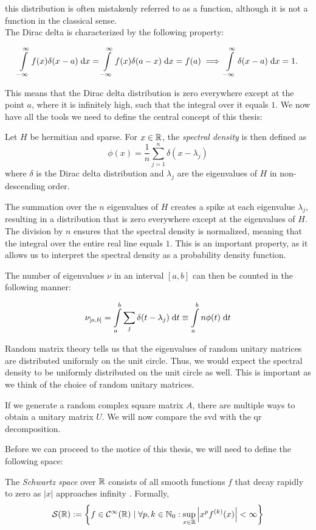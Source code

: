 this distribution is often mistakenly referred to as a function,
although it is not a function in the classical sense.\\
The Dirac delta is characterized by the following property:

\[
\int\limits_{-\infty}^{\infty} f(x) \delta(x-a) \;\mathrm{d}x = \int\limits_{-\infty}^{\infty} f(x) \delta(a-x) \;\mathrm{d}x = f(a) \implies \int\limits_{-\infty}^{\infty} \delta(x-a) \;\mathrm{d}x = 1.
\]

This means that the Dirac delta distribution is zero everywhere except at the point $a$,
where it is infinitely high, such that the integral over it equals $1$.
We now have all the tools we need to define the central concept of this thesis:

\begin{definition}
    Let $H$ be hermitian and sparse.
    For $x \in \mathbb{R}$, the \emph{spectral density} is then defined as
    \[
    \phi(x) = \frac{1}{n} \sum_{j=1}^{n} \delta(x - \lambda_j)
    \]
    where $\delta$ is the Dirac delta distribution
    and $\lambda_j$ are the eigenvalues of $H$ in non-descending order.
\end{definition}

The summation over the $n$ eigenvalues of $H$ creates a spike at each eigenvalue $\lambda_j$,
resulting in a distribution that is zero everywhere except at the eigenvalues of $H$.
The division by $n$ ensures that the spectral density is normalized,
meaning that the integral over the entire real line equals $1$.
This is an important property, as it allows us to interpret the spectral density as a probability density function.

The number of eigenvalues $\nu$ in an interval $[a, b]$ can then be counted in the following manner:

\begin{equation} \label{eq:nu_a_b}
    \nu_{[a, b]} = \int\limits_a^b \sum_j \delta(t - \lambda_j) \;\mathrm{d}t \equiv \int\limits_a^b n \phi(t) \;\mathrm{d}t
\end{equation}

Random matrix theory tells us that the eigenvalues of random unitary matrices are distributed uniformly on the unit circle.
Thus, we would expect the spectral density to be uniformly distributed on the unit circle as well.
This is important as we think of the choice of random unitary matrices.

If we generate a random complex square matrix $A$,
there are multiple ways to obtain a unitary matrix $U$.
We will now compare the svd with the qr decomposition.

Before we can proceed to the motice of this thesis, we will need to define the following space:

\begin{definition} \label{def:Schwartz space}
    The \emph{Schwartz space} over $\mathbb{R}$ consists of all smooth functions $f$ that decay rapidly to zero as $|x|$ approaches infinity \cite{richtmyer}.
    Formally,
    \[
    \mathcal{S}(\mathbb{R}) := \left\{f \in \mathcal{C}^{\infty}(\mathbb{R}) \mid \forall p, k \in \mathbb{N}_0: \sup_{x \in \mathbb{R}} \left| x^p f^{(k)}(x) \right| < \infty \right\}
    \]
\end{definition}